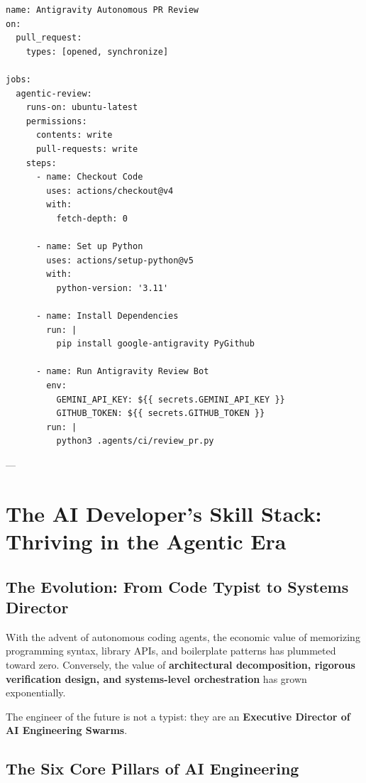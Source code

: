 \documentclass[11pt,a4paper,oneside]{book}
\begin{document}
\begin{lstlisting}[caption={File: .github/workflows/antigravity\_review.yml}]
name: Antigravity Autonomous PR Review
on:
  pull_request:
    types: [opened, synchronize]

jobs:
  agentic-review:
    runs-on: ubuntu-latest
    permissions:
      contents: write
      pull-requests: write
    steps:
      - name: Checkout Code
        uses: actions/checkout@v4
        with:
          fetch-depth: 0

      - name: Set up Python
        uses: actions/setup-python@v5
        with:
          python-version: '3.11'

      - name: Install Dependencies
        run: |
          pip install google-antigravity PyGithub

      - name: Run Antigravity Review Bot
        env:
          GEMINI_API_KEY: ${{ secrets.GEMINI_API_KEY }}
          GITHUB_TOKEN: ${{ secrets.GITHUB_TOKEN }}
        run: |
          python3 .agents/ci/review_pr.py
\end{lstlisting}

---

\chapter{The AI Developer's Skill Stack: Thriving in the Agentic Era}

\section{The Evolution: From Code Typist to Systems Director}
With the advent of autonomous coding agents, the economic value of memorizing programming syntax, library APIs, and boilerplate patterns has plummeted toward zero. Conversely, the value of \textbf{architectural decomposition, rigorous verification design, and systems-level orchestration} has grown exponentially.

The engineer of the future is not a typist: they are an \textbf{Executive Director of AI Engineering Swarms}.

\section{The Six Core Pillars of AI Engineering}
\end{document}

